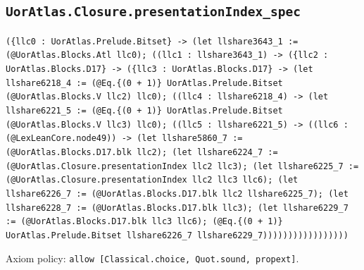 \documentclass[11pt]{article}
\begin{document}
\subsection*{\texttt{UorAtlas.Closure.presentationIndex\_spec}}
\noindent\texttt{(\{llc0 : UorAtlas.Prelude.Bitset\} -> (let llshare3643\_1 := (@UorAtlas.Blocks.Atl llc0); ((llc1 : llshare3643\_1) -> (\{llc2 : UorAtlas.Blocks.D17\} -> (\{llc3 : UorAtlas.Blocks.D17\} -> (let llshare6218\_4 := (@Eq.\{(0 + 1)\} UorAtlas.Prelude.Bitset (@UorAtlas.Blocks.V llc2) llc0); ((llc4 : llshare6218\_4) -> (let llshare6221\_5 := (@Eq.\{(0 + 1)\} UorAtlas.Prelude.Bitset (@UorAtlas.Blocks.V llc3) llc0); ((llc5 : llshare6221\_5) -> ((llc6 : (@LexLeanCore.node49)) -> (let llshare5860\_7 := (@UorAtlas.Blocks.D17.blk llc2); (let llshare6224\_7 := (@UorAtlas.Closure.presentationIndex llc2 llc3); (let llshare6225\_7 := (@UorAtlas.Closure.presentationIndex llc2 llc3 llc6); (let llshare6226\_7 := (@UorAtlas.Blocks.D17.blk llc2 llshare6225\_7); (let llshare6228\_7 := (@UorAtlas.Blocks.D17.blk llc3); (let llshare6229\_7 := (@UorAtlas.Blocks.D17.blk llc3 llc6); (@Eq.\{(0 + 1)\} UorAtlas.Prelude.Bitset llshare6226\_7 llshare6229\_7)))))))))))))))))}\par
\noindent Axiom policy: \texttt{allow [Classical.choice, Quot.sound, propext]}.\par
\end{document}
